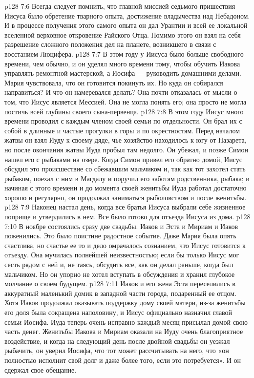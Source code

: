 \vs p128 7:6 Всегда следует помнить, что главной миссией седьмого пришествия Иисуса было обретение тварного опыта, достижение владычества над Небадоном. И в процессе получения этого самого опыта он дал Урантии и всей ее локальной вселенной верховное откровение Райского Отца. Помимо этого он взял на себя разрешение сложного положения дел на планете, возникшего в связи с восстанием Люцифера.
\vs p128 7:7 \pc В этом году у Иисуса было больше свободного времени, чем обычно, и он уделял много времени тому, чтобы обучить Иакова управлять ремонтной мастерской, а Иосифа --- руководить домашними делами. Мария чувствовала, что он готовится покинуть их. Но куда он собирался направиться? И что он намеревался делать? Она почти отказалась от мысли о том, что Иисус является Мессией. Она не могла понять его; она просто не могла постичь всей глубины своего сына\hyp{}первенца.
\vs p128 7:8 В этом году Иисус много времени проводил с каждым членом своей семьи по отдельности. Он брал их с собой в длинные и частые прогулки в горы и по окрестностям. Перед началом жатвы он взял Иуду к своему дяде, чье хозяйство находилось к югу от Назарета, но после окончания жатвы Иуда пробыл там недолго. Он убежал, и позже Симон нашел его с рыбаками на озере. Когда Симон привел его обратно домой, Иисус обсудил это происшествие со сбежавшим мальчиком и, так как тот захотел стать рыбаком, поехал с ним в Магдалу и поручил его заботам родственника, рыбака; и начиная с этого времени и до момента своей женитьбы Иуда работал достаточно хорошо и регулярно, он продолжал заниматься рыболовством и после женитьбы.
\vs p128 7:9 \pc Наконец настал день, когда все братья Иисуса выбрали себе жизненное поприще и утвердились в нем. Все было готово для отъезда Иисуса из дома.
\vs p128 7:10 \pc В ноябре состоялись сразу две свадьбы. Иаков и Эста и Мириам и Иаков поженились. Это было поистине радостное событие. Даже Мария была опять счастлива, но счастье ее то и дело омрачалось сознанием, что Иисус готовится к отъезду. Она мучилась полнейшей неизвестностью; если бы только Иисус мог сесть рядом с ней и, не таясь, обсудить все, как он делал раньше, когда был мальчиком. Но он упорно не хотел вступать в обсуждения и хранил глубокое молчание о своем будущем.
\vs p128 7:11 Иаков и его жена Эста переселились в аккуратный маленький домик в западной части города, подаренный ее отцом. Хотя Иаков продолжал оказывать поддержку дому своей матери, из\hyp{}за женитьбы его доля была сокращена наполовину, и Иисус официально назначил главой семьи Иосифа. Иуда теперь очень исправно каждый месяц присылал домой свою часть денег. Женитьбы Иакова и Мириам оказали на Иуду очень благоприятное воздействие, и когда на следующий день после двойной свадьбы он уезжал рыбачить, он уверил Иосифа, что тот может рассчитывать на него, что «он полностью исполнит свой долг и даже более того, если это потребуется». И он сдержал свое обещание.
